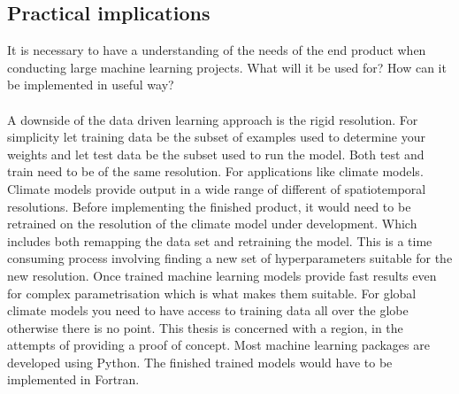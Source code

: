 
\subsection{Practical implications} \label{sec:practical_implications}
It is necessary to have a understanding of the needs of the end product when conducting large machine learning projects. What will it be used for? How can it be implemented in useful way?
\\ \\
A downside of the data driven learning approach is the rigid resolution. For simplicity let training data be the subset of examples used to determine your weights and let test data be the subset used to run the model. Both test and train need to be of the same resolution. For applications like climate models. Climate models provide output in a wide range of different of spatiotemporal resolutions. Before implementing the finished product, it would need to be retrained on the resolution of the climate model under development. Which includes both remapping the data set and retraining the model. This is a time consuming process involving finding a new set of hyperparameters suitable for the new resolution. %
Once trained machine learning models provide fast results even for complex parametrisation which is what makes them suitable. For global climate models you need to have access to training data all over the globe otherwise there is no point. This thesis is concerned with a region, in the attempts of providing a proof of concept. %
Most machine learning packages are developed using Python. The finished trained models would have to be implemented in Fortran.
